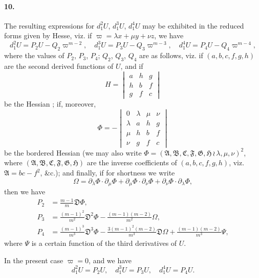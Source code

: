 \documentclass[11pt,a4paper]{book}
\begin{document}
\paragraph{10.}
The  resulting  expressions   for  $d_1^2 U$,  $d_1^3 U$,  $d_1^4 U$  may  be  exhibited  in  the  reduced
forms  given  by  Hesse,  viz.  if  $\varpi = \lambda x + \mu y + \nu z$,  we  have
\[
d_1^2 U = P_2 U - Q_2 \varpi^{m-2}, \quad d_1^3 U = P_3 U - Q_3 \varpi^{m-3}, \quad d_1^4 U = P_4 U - Q_4 \varpi^{m-4},
\]
where   the   values   of  $P_2$,  $P_3$,  $P_4$;   $Q_2$,  $Q_3$,  $Q_4$   are   as  follows,   viz.   if  $(a, b, c, f, g, h)$  are
the  second  derived  functions  of  $U$,  and  if
\[
H = \begin{vmatrix} a & h & g \\ h & b & f \\ g & f & c \end{vmatrix}
\]
be  the  Hessian ;   if,  moreover,
\[
\Phi = -\begin{vmatrix} 0 & \lambda & \mu & \nu \\ \lambda & a & h & g \\ \mu & h & b & f \\ \nu & g & f & c \end{vmatrix}
\]
be  the  bordered  Hessian  (we  may  also  write  $\Phi = (\mathfrak{A}, \mathfrak{B}, \mathfrak{C}, \mathfrak{F}, \mathfrak{G}, \mathfrak{H} \,\!\!\wr\, \lambda, \mu, \nu)^2$,  where
$(\mathfrak{A}, \mathfrak{B}, \mathfrak{C}, \mathfrak{F}, \mathfrak{G}, \mathfrak{H})$  are  the  inverse  coefficients  of  $(a, b, c, f, g, h)$,  viz.  $\mathfrak{A} = bc - f^2$,  \&c.);  
and  finally,  if  for  shortness  we  write
\[
\Omega = \partial_\lambda \Phi \cdot \partial_\mu \Phi + \partial_\mu \Phi \cdot \partial_\nu \Phi + \partial_\nu \Phi \cdot \partial_\lambda \Phi,
\]
then  we  have
\begin{align*}
P_2 &= \frac{m-1}{m} \mathfrak{D} \Phi, \\
P_3 &= \frac{(m-1)^2}{m^2} \mathfrak{D}^2 \Phi - \frac{(m-1)(m-2)}{m^2} \Omega, \\
P_4 &= \frac{(m-1)^3}{m^3} \mathfrak{D}^3 \Phi - \frac{3(m-1)^2(m-2)}{m^3} \mathfrak{D} \Omega + \frac{(m-1)(m-2)}{m^3} \Psi,
\end{align*}
where  $\Psi$  is  a  certain  function  of  the  third  derivatives  of  $U$.

\newpage

In  the  present  case  $\varpi = 0$,  and  we  have
\[
d_1^2 U = P_2 U, \quad d_1^3 U = P_3 U, \quad d_1^4 U = P_4 U.
\]
\end{document}
